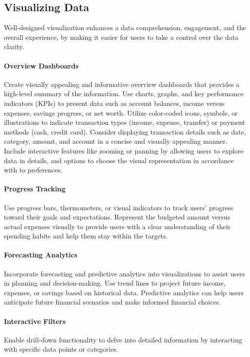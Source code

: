 \subsection{Visualizing Data}

Well-designed visualization enhances a data comprehension, engagement, and the overall experience, by making it easier 
for users to take a control over the data clarity.

\paragraph{Overview Dashboards}
Create visually appealing and informative overview dashboards that provides a high-level summary of the information. 
Use charts, graphs, and key performance indicators (KPIs) to present data such as account balances, income versus 
expenses, savings progress, or net worth. Utilize color-coded icons, symbols, or illustrations to indicate transaction 
types (income, expense, transfer) or payment methods (cash, credit card). Consider displaying transaction details such 
as date, category, amount, and account in a concise and visually appealing manner. Include interactive features like 
zooming or panning by allowing users to explore data in details, and options to choose the visual representation in
accordance with to preferences.

\paragraph{Progress Tracking}
Use progress bars, thermometers, or visual indicators to track users' progress toward their goals and expectations. 
Represent the budgeted amount versus actual expenses visually to provide users with a clear understanding of their 
spending habits and help them stay within the targets.

\paragraph{Forecasting Analytics}
Incorporate forecasting and predictive analytics into visualizations to assist users in planning and decision-making.
Use trend lines to project future income, expenses, or savings based on historical data. Predictive analytics can help 
users anticipate future financial scenarios and make informed financial choices.

\paragraph{Interactive Filters}
Enable drill-down functionality to delve into detailed information by interacting with specific data points or 
categories.

